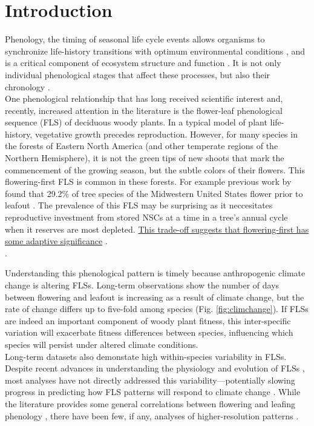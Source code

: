 \documentclass[11pt]{article}
\begin{document}
\section*{Introduction}
Phenology, the timing of seasonal life cycle events allows organisms to synchronize life-history transitions with optimum environmental conditions \citep{Forrest2010}, and is a critical component of ecosystem structure and function \citep{Cleland2007,Piao2007}. It is not only individual phenological stages that affect these processes, but also their chronology \citep{Ettinger2018}.\\

\noindent One phenological relationship that has long received scientific interest \citep[see][]{Robertson1895} and, recently, increased attention in the literature \citep{Savage2019, Gougherty2018} is the flower-leaf phenological sequence (FLS) of deciduous woody plants. In a typical model of plant life-history, vegetative growth precedes reproduction. However, for many species in the forests of Eastern North America (and other temperate regions of the Northern Hemisphere), it is not the green tips of new shoots that mark the commencement of the growing season, but the subtle colors of their flowers. This flowering-first FLS is common in these forests. For example previous work by \citet{Gougherty2018} found that 29.2\% of tree species of the Midwestern United States flower prior to leafout . The prevalence of this FLS may be surprising as it neccesitates reproductive investment from stored NSCs at a time in a tree's annual cycle when it reserves are most depleted. \underline{This trade-off suggests that flowering-first has some adaptive significance} \citep{Rathcke_1985}.\\  .

\noindent Understanding this phenological pattern is timely because anthropogenic climate change is altering FLSs. Long-term observations show the number of days between flowering and leafout is increasing as a result of climate change, but the rate of change differs up to five-fold among species (Fig. \ref{fig:climchange}).  If FLSs are indeed an important component of woody plant fitness, this inter-specific variation will exacerbate fitness differences between species, influencing which species will persist under altered climate conditions.\\ 

\noindent Long-term datasets also demonstate high within-species variability in FLSs. Despite recent advances in understanding the physiology and evolution of FLSs \citep{Gougherty2018,Savage2019}, most analyses have not directly addressed this variability---potentially slowing progress in predicting how FLS patterns will respond to climate change . While the literature provides some general correlations between flowering and leafing phenology \citep{Lechowicz_1995, Ettinger2018}, there have been few, if any, analyses of higher-resolution patterns \citep{Gougherty2018}. \\
\end{document}
